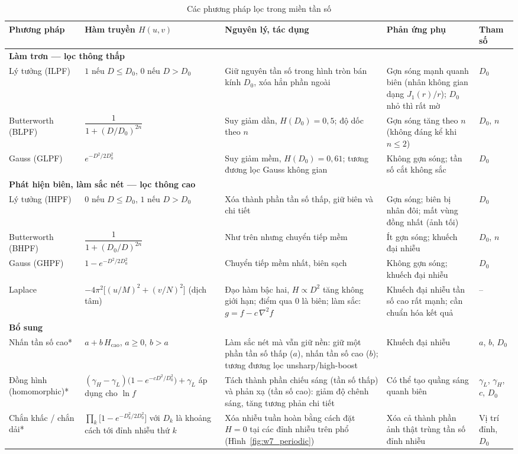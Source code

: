 \begin{table}[!htbp]
\centering
\scriptsize
\caption{Các phương pháp lọc trong miền tần số}
\label{tab:w7_methods}
\renewcommand{\arraystretch}{1.3}
\begin{tabularx}{\textwidth}{|p{1.55cm}|p{2.6cm}|X|X|p{1.3cm}|}
\hline
\textbf{Phương pháp} & \textbf{Hàm truyền $H(u, v)$} & \textbf{Nguyên lý, tác dụng} & \textbf{Phản ứng phụ} & \textbf{Tham số} \\
\hline
\multicolumn{5}{|l|}{\textbf{Làm trơn — lọc thông thấp}} \\
\hline
Lý tưởng (ILPF) & $1$ nếu $D \le D_0$, $0$ nếu $D > D_0$ & Giữ nguyên tần số trong hình tròn bán kính $D_0$, xóa hẳn phần ngoài & Gợn sóng mạnh quanh biên (nhân không gian dạng $J_1(r)/r$); $D_0$ nhỏ thì rất mờ & $D_0$ \\
\hline
Butterworth (BLPF) & $\dfrac{1}{1 + (D/D_0)^{2n}}$ & Suy giảm dần, $H(D_0) = 0{,}5$; độ dốc theo $n$ & Gợn sóng tăng theo $n$ (không đáng kể khi $n \le 2$) & $D_0$, $n$ \\
\hline
Gauss (GLPF) & $e^{-D^2/2D_0^2}$ & Suy giảm mềm, $H(D_0) = 0{,}61$; tương đương lọc Gauss không gian & Không gợn sóng; tần số cắt không sắc & $D_0$ \\
\hline
\multicolumn{5}{|l|}{\textbf{Phát hiện biên, làm sắc nét — lọc thông cao}} \\
\hline
Lý tưởng (IHPF) & $0$ nếu $D \le D_0$, $1$ nếu $D > D_0$ & Xóa thành phần tần số thấp, giữ biên và chi tiết & Gợn sóng; biên bị nhân đôi; mất vùng đồng nhất (ảnh tối) & $D_0$ \\
\hline
Butterworth (BHPF) & $\dfrac{1}{1 + (D_0/D)^{2n}}$ & Như trên nhưng chuyển tiếp mềm & Ít gợn sóng; khuếch đại nhiễu & $D_0$, $n$ \\
\hline
Gauss (GHPF) & $1 - e^{-D^2/2D_0^2}$ & Chuyển tiếp mềm nhất, biên sạch & Không gợn sóng; khuếch đại nhiễu & $D_0$ \\
\hline
Laplace & $-4\pi^2\big[(u/M)^2 + (v/N)^2\big]$ (dịch tâm) & Đạo hàm bậc hai, $H \propto D^2$ tăng không giới hạn; điểm qua $0$ là biên; làm sắc: $g = f - c\,\nabla^2 f$ & Khuếch đại nhiễu tần số cao rất mạnh; cần chuẩn hóa kết quả & -- \\
\hline
\multicolumn{5}{|l|}{\textbf{Bổ sung}} \\
\hline
Nhấn tần số cao* & $a + b\,H_{\text{cao}}$, $a \ge 0$, $b > a$ & Làm sắc nét mà vẫn giữ nền: giữ một phần tần số thấp ($a$), nhấn tần số cao ($b$); tương đương lọc unsharp/high-boost & Khuếch đại nhiễu & $a$, $b$, $D_0$ \\
\hline
Đồng hình (homomorphic)* & $(\gamma_H - \gamma_L)\big(1 - e^{-cD^2/D_0^2}\big) + \gamma_L$ áp dụng cho $\ln f$ & Tách thành phần chiếu sáng (tần số thấp) và phản xạ (tần số cao): giảm độ chênh sáng, tăng tương phản chi tiết & Có thể tạo quầng sáng quanh biên & $\gamma_L$, $\gamma_H$, $c$, $D_0$ \\
\hline
Chắn khấc / chắn dải* & $\prod_k \big[1 - e^{-D_k^2/2D_0^2}\big]$ với $D_k$ là khoảng cách tới đỉnh nhiễu thứ $k$ & Xóa nhiễu tuần hoàn bằng cách đặt $H = 0$ tại các đỉnh nhiễu trên phổ (Hình~\ref{fig:w7_periodic}) & Xóa cả thành phần ảnh thật trùng tần số đỉnh nhiễu & Vị trí đỉnh, $D_0$ \\
\hline
\end{tabularx}
\end{table}
